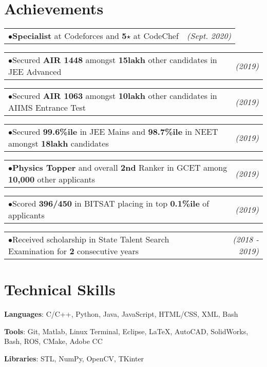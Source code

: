 \documentclass[a4paper,11pt]{article}
\makeatletter
\newcommand{\extracurr}[2]{
    \begin{tabular*}{0.977\textwidth}{l@{\extracolsep{\fill}}r}
        \tiny{$\bullet$}\hspace{7pt}\small{#1} & \textit{\small{#2}} \\
    \end{tabular*}\vspace{-11pt}
}
\makeatother
\begin{document}
  \section{Achievements}
    \begin{adjustwidth}{10.8pt}{}
          \extracurr{\textbf{Specialist} at Codeforces and \textbf{5\hspace{1pt}$\star$} at CodeChef}{(Sept. 2020)}
          
          \extracurr{Secured \textbf{AIR 1448} amongst \textbf{15lakh} other candidates in JEE Advanced}{(2019)}
          
          \extracurr{Secured \textbf{AIR 1063} amongst \textbf{10lakh} other candidates in AIIMS Entrance Test}{(2019)}
          
          \extracurr{Secured \textbf{99.6\%ile} in JEE Mains and \textbf{98.7\%ile} in NEET amongst \textbf{18lakh} candidates}{(2019)}
          
          \extracurr{\textbf{Physics Topper} and overall \textbf{2nd} Ranker in GCET among \textbf{10,000} other applicants} {(2019)}
          
          \extracurr{Scored \textbf{396/450} in BITSAT placing in top \textbf{0.1\%ile} of applicants}{(2019)}
          
          \extracurr{Received scholarship in State Talent Search Examination for \textbf{2} consecutive years}{(2018 - 2019)}
        
    \end{adjustwidth}

  \section{Technical Skills}
   \begin{itemize}[leftmargin=0.15in, label={}]
      \small{\item{
       \textbf{Languages}{: C/C++, Python, Java, JavaScript, HTML/CSS, XML, Bash} \\ \vspace{1.5mm}
       
       \textbf{Tools}{: Git, Matlab, Linux Terminal, Eclipse, \LaTeX, AutoCAD, SolidWorks, Bash, ROS, CMake, Adobe CC} \\ \vspace{1.5mm}
       
       \textbf{Libraries}{: STL, NumPy, OpenCV, TKinter} 
      }}
   \end{itemize}
\end{document}
